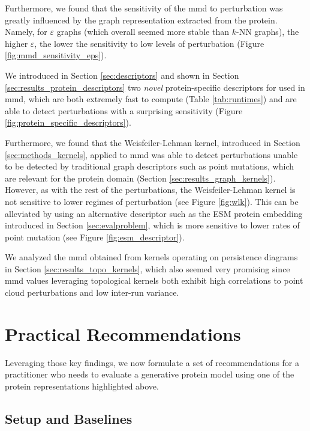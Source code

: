 Furthermore, we found that the sensitivity of the \acrshort{mmd} to perturbation was
greatly influenced by the graph representation extracted from the protein.
Namely, for $\varepsilon$ graphs (which overall seemed more stable than $k$-NN
graphs), the higher $\varepsilon$, the lower the sensitivity to low levels of
perturbation (Figure \ref{fig:mmd_sensitivity_eps}).

We introduced in Section \ref{sec:descriptors} and shown in Section
\ref{sec:results_protein_descriptors} two \emph{novel} protein-specific descriptors for
used in \acrshort{mmd}, which are both extremely fast to compute (Table \ref{tab:runtimes})
and are able to detect perturbations with a surprising sensitivity (Figure
\ref{fig:protein_specific_descriptors}).

Furthermore, we found that the Weisfeiler-Lehman kernel, introduced in Section
\ref{sec:methods_kernels}, applied to \acrshort{mmd} was able to detect perturbations
unable to be detected by traditional graph descriptors such as point mutations,
which are relevant for the protein domain (Section
\ref{sec:results_graph_kernels}). However, as with the rest of the perturbations,
the Weisfeiler-Lehman kernel is not sensitive to lower regimes of perturbation
(see Figure \ref{fig:wlk}).
This can be alleviated by using an alternative descriptor such as the ESM
protein embedding introduced in Section \ref{sec:evalproblem}, which is more
sensitive to lower rates of point mutation (see Figure
\ref{fig:esm_descriptor}).

We analyzed the \acrshort{mmd} obtained from kernels operating on persistence diagrams in
Section \ref{sec:results_topo_kernels}, which also seemed very promising since
\acrshort{mmd} values leveraging topological kernels both exhibit high correlations to
point cloud perturbations and low inter-run variance.

\section{Practical Recommendations}\label{sec:discussion_recommendations}

Leveraging those key findings, we now formulate a set of recommendations for a
practitioner who needs to evaluate a generative protein model using one of the
protein representations highlighted above.


\subsection{Setup and Baselines}\label{sec:discussion_baselines}

